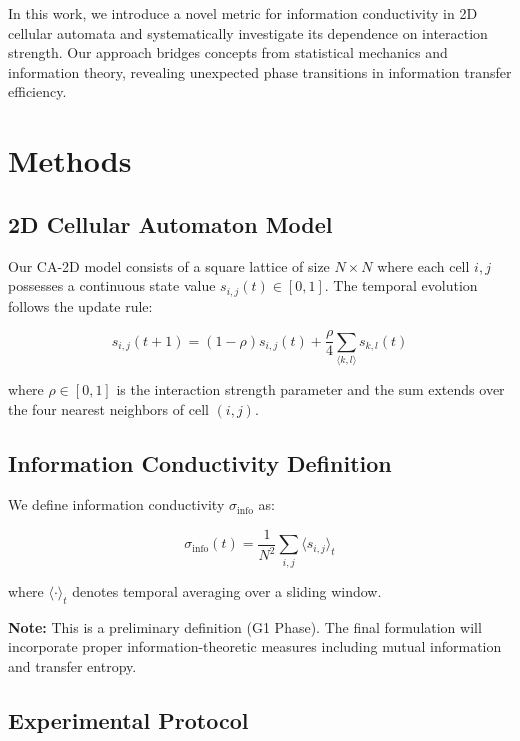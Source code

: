 \documentclass[twocolumn,showpacs,preprintnumbers,amsmath,amssymb,prb]{revtex4-2}
\begin{document}
In this work, we introduce a novel metric for information conductivity in 2D cellular automata and systematically investigate its dependence on interaction strength. Our approach bridges concepts from statistical mechanics and information theory, revealing unexpected phase transitions in information transfer efficiency.

\section{Methods}

\subsection{2D Cellular Automaton Model}

Our CA-2D model consists of a square lattice of size $N \times N$ where each cell $i,j$ possesses a continuous state value $s_{i,j}(t) \in [0,1]$. The temporal evolution follows the update rule:

\begin{equation}
s_{i,j}(t+1) = (1-\rho) s_{i,j}(t) + \frac{\rho}{4} \sum_{\langle k,l \rangle} s_{k,l}(t)
\label{eq:update_rule}
\end{equation}

where $\rho \in [0,1]$ is the interaction strength parameter and the sum extends over the four nearest neighbors of cell $(i,j)$.

\subsection{Information Conductivity Definition}

We define information conductivity $\sigma_{\text{info}}$ as:

\begin{equation}
\sigma_{\text{info}}(t) = \frac{1}{N^2} \sum_{i,j} \langle s_{i,j} \rangle_t
\label{eq:info_conductivity}
\end{equation}

where $\langle \cdot \rangle_t$ denotes temporal averaging over a sliding window.

\textbf{Note:} This is a preliminary definition (G1 Phase). The final formulation will incorporate proper information-theoretic measures including mutual information and transfer entropy.

\subsection{Experimental Protocol}
\end{document}
